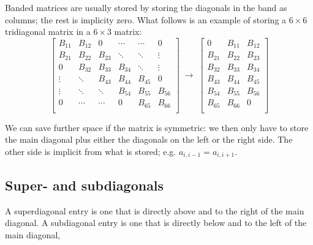 Banded matrices are usually stored by storing the diagonals in the band as columns; the rest is implicity zero. What follows is an example of storing a $6\times 6$ tridiagonal matrix in a $6\times 3$ matrix:
\[
  \begin{bmatrix}
    B_{11} & B_{12} & 0      & \cdots & \cdots & 0      \\
    B_{21} & B_{22} & B_{23} & \ddots & \ddots & \vdots \\
    0      & B_{32} & B_{33} & B_{34} & \ddots & \vdots \\
    \vdots & \ddots & B_{43} & B_{44} & B_{45} & 0      \\
    \vdots & \ddots & \ddots & B_{54} & B_{55} & B_{56} \\
    0      & \cdots & \cdots & 0      & B_{65} & B_{66} \\
  \end{bmatrix}
  \;\rightarrow\;
  \begin{bmatrix}
    0      & B_{11} & B_{12} \\
    B_{21} & B_{22} & B_{23} \\
    B_{32} & B_{33} & B_{34} \\
    B_{43} & B_{44} & B_{45} \\
    B_{54} & B_{55} & B_{56} \\
    B_{65} & B_{66} & 0      \\
  \end{bmatrix}
\]

We can save further space if the matrix is symmetric: we then only have to store the main diagonal plus either the diagonals on the left or the right side. The other side is implicit from what is stored; e.g. $a_{i,i-1}=a_{i,i+1}$.


\subsection{Super- and subdiagonals} %
\label{sub:super_and_subdiagonals}
A superdiagonal entry is one that is directly above and to the right of the main diagonal. A subdiagonal entry is one that is directly below and to the left of the main diagonal,



